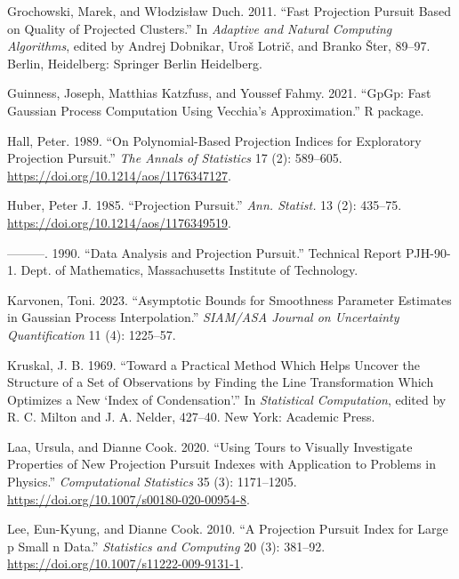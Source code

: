 \documentclass[
  12pt,
]{interact}
\newlength{\cslhangindent}
\newenvironment{CSLReferences}[2] %
 {\begin{list}{}{%
  \setlength{\itemindent}{0pt}
  \setlength{\leftmargin}{0pt}
  \setlength{\parsep}{0pt}
  \ifodd #1
   \setlength{\leftmargin}{\cslhangindent}
   \setlength{\itemindent}{-1\cslhangindent}
  \fi
  \setlength{\itemsep}{#2\baselineskip}}}
 {\end{list}}
\theoremstyle{plain}
\begin{document}
\begin{CSLReferences}{1}{0}
Grochowski, Marek, and Włodzisław Duch. 2011. {``Fast Projection Pursuit
Based on Quality of Projected Clusters.''} In \emph{Adaptive and Natural
Computing Algorithms}, edited by Andrej Dobnikar, Uroš Lotrič, and
Branko Šter, 89--97. Berlin, Heidelberg: Springer Berlin Heidelberg.

Guinness, Joseph, Matthias Katzfuss, and Youssef Fahmy. 2021. {``{GpGp}:
Fast {G}aussian Process Computation Using {V}ecchia's Approximation.''}
R package.

Hall, Peter. 1989. {``On Polynomial-Based Projection Indices for
Exploratory Projection Pursuit.''} \emph{The Annals of Statistics} 17
(2): 589--605. \url{https://doi.org/10.1214/aos/1176347127}.

Huber, Peter J. 1985. {``Projection Pursuit.''} \emph{Ann. Statist.} 13
(2): 435--75. \url{https://doi.org/10.1214/aos/1176349519}.

---------. 1990. {``Data Analysis and Projection Pursuit.''} Technical
Report PJH-90-1. Dept. of Mathematics, Massachusetts Institute of
Technology.

Karvonen, Toni. 2023. {``Asymptotic Bounds for Smoothness Parameter
Estimates in {G}aussian Process Interpolation.''} \emph{SIAM/ASA Journal
on Uncertainty Quantification} 11 (4): 1225--57.

Kruskal, J. B. 1969. {``Toward a Practical Method Which Helps Uncover
the Structure of a Set of Observations by Finding the Line
Transformation Which Optimizes a New {`Index of Condensation'}.''} In
\emph{Statistical Computation}, edited by R. C. Milton and J. A. Nelder,
427--40. New York: Academic Press.

Laa, Ursula, and Dianne Cook. 2020. {``Using Tours to Visually
Investigate Properties of New Projection Pursuit Indexes with
Application to Problems in Physics.''} \emph{Computational Statistics}
35 (3): 1171--1205. \url{https://doi.org/10.1007/s00180-020-00954-8}.

Lee, Eun-Kyung, and Dianne Cook. 2010. {``A Projection Pursuit Index for
Large p Small n Data.''} \emph{Statistics and Computing} 20 (3):
381--92. \url{https://doi.org/10.1007/s11222-009-9131-1}.


\end{CSLReferences}
\end{document}
